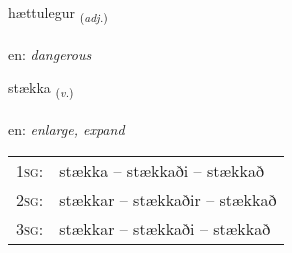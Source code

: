 \documentclass[frontgrid, backgrid]{flacards}\usepackage[]{graphicx}\usepackage[]{color}
\begin{document}
\renewcommand{\blhead}{\vskip5pt {\small\bfseries\footnotesize Lýsingarorð | Adjective }}
\renewcommand{\bcfoot}{\vskip5pt \hspace{2pt}{\small\bfseries\footnotesize 2K}}


{hættulegur \small{\textsubscript{(\textit{adj.})}} \\[1ex] %
\textphonetic{[haihtʏlɛɣʏr]} \\
en: \emph{dangerous} \\  [2ex]
\renewcommand*{\arraystretch}{0.8}
}

\renewcommand{\flhead}{\vskip5pt \fboxsep=0pt {\small\bfseries\footnotesize Sagnorð | Verb}}
\renewcommand{\fcfoot}{\vskip5pt \fboxsep=0pt \hspace{2pt}{\small\bfseries\footnotesize 2K}}

\renewcommand{\blhead}{\vskip5pt {\small\bfseries\footnotesize Sagnorð | Verb }}
\renewcommand{\bcfoot}{\vskip5pt \hspace{2pt}{\small\bfseries\footnotesize 2K}}


{stækka \small{\textsubscript{(\textit{v.})}} \\[1ex] %
\textphonetic{[staihka]} \\
en: \emph{enlarge, expand} \\  [2ex]
\renewcommand*{\arraystretch}{0.8}
\begin{tabular}{p{1cm}l}
\textsc{1sg}: & stækka -- stækkaði -- stækkað \\ 
\textsc{2sg}: & stækkar -- stækkaðir -- stækkað \\ 
\textsc{3sg}: & stækkar -- stækkaði -- stækkað \\ 
\end{tabular}
}
\end{document}

